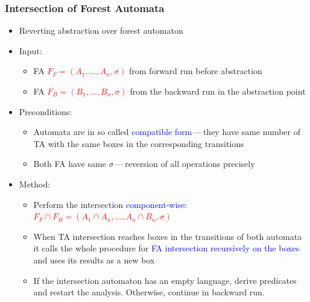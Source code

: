 \documentclass{beamer}
\newcommand{\hlbl}[1]{\textcolor{blue}{#1}}
\newcommand{\hlgr}[1]{\textcolor{olive!50!green}{#1}}
\newcommand{\hlrd}[1]{\textcolor{red}{#1}}
\begin{document}

\begin{frame}
\frametitle{Intersection of Forest Automata}
	\begin{itemize}
		\item Reverting abstraction over forest automaton
		\item \hlgr{Input:}
			\begin{itemize}
				\item FA \hlrd{$F_F=(A_1, \ldots, A_n, \sigma)$} from forward run before abstraction
			    \item FA \hlrd{$F_B=(B_1,\ldots, B_n, \sigma)$} from the backward run in the abstraction point
			\end{itemize}
		\item \hlgr{Preconditions:}
			\begin{itemize}
				\item Automata are in so called \hlbl{compatible form}\,---\,they
					have same number of TA with the same boxes in the corresponding transitions 
				\item Both FA have same $\sigma$\,---\,reversion of all operations precisely
			\end{itemize}

		\item \hlgr{Method:}
			\begin{itemize}
				\item Perform the intersection \hlbl{component-wise:} \hlrd{$F_F \cap F_B = (A_1 \cap A_n,\ldots,A_n\cap B_n, \sigma)$}
				\item When TA intersection reaches boxes in the transitions of both automata it calls the whole
					procedure for \hlbl{FA intersection recursively on the boxes} and uses its results as a new box
				\item If the intersection automaton has an empty language, derive predicates and restart the analysis.
					Otherwise, continue in backward run. 
			\end{itemize}
	\end{itemize}
\end{frame}

\end{document}
